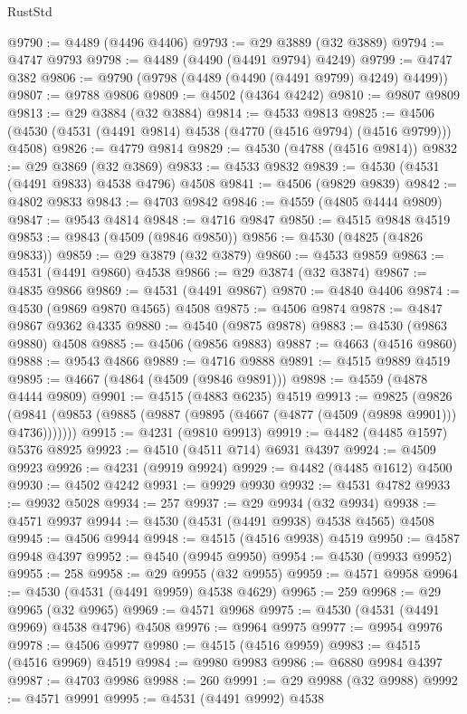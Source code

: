 \begin{lexlean}{RustStd}
\begin{coremodule}
@9790 := @4489 (@4496 @4406)
@9793 := @29 @3889 (@32 @3889)
@9794 := @4747 @9793
@9798 := @4489 (@4490 (@4491 @9794) @4249)
@9799 := @4747 @382
@9806 := @9790 (@9798 (@4489 (@4490 (@4491 @9799) @4249) @4499))
@9807 := @9788 @9806
@9809 := @4502 (@4364 @4242)
@9810 := @9807 @9809
@9813 := @29 @3884 (@32 @3884)
@9814 := @4533 @9813
@9825 := @4506 (@4530 (@4531 (@4491 @9814) @4538 (@4770 (@4516 @9794) (@4516 @9799))) @4508)
@9826 := @4779 @9814
@9829 := @4530 (@4788 (@4516 @9814))
@9832 := @29 @3869 (@32 @3869)
@9833 := @4533 @9832
@9839 := @4530 (@4531 (@4491 @9833) @4538 @4796) @4508
@9841 := @4506 (@9829 @9839)
@9842 := @4802 @9833
@9843 := @4703 @9842
@9846 := @4559 (@4805 @4444 @9809)
@9847 := @9543 @4814
@9848 := @4716 @9847
@9850 := @4515 @9848 @4519
@9853 := @9843 (@4509 (@9846 @9850))
@9856 := @4530 (@4825 (@4826 @9833))
@9859 := @29 @3879 (@32 @3879)
@9860 := @4533 @9859
@9863 := @4531 (@4491 @9860) @4538
@9866 := @29 @3874 (@32 @3874)
@9867 := @4835 @9866
@9869 := @4531 (@4491 @9867)
@9870 := @4840 @4406
@9874 := @4530 (@9869 @9870 @4565) @4508
@9875 := @4506 @9874
@9878 := @4847 @9867 @9362 @4335
@9880 := @4540 (@9875 @9878)
@9883 := @4530 (@9863 @9880) @4508
@9885 := @4506 (@9856 @9883)
@9887 := @4663 (@4516 @9860)
@9888 := @9543 @4866
@9889 := @4716 @9888
@9891 := @4515 @9889 @4519
@9895 := @4667 (@4864 (@4509 (@9846 @9891)))
@9898 := @4559 (@4878 @4444 @9809)
@9901 := @4515 (@4883 @6235) @4519
@9913 := @9825
    (@9826 (@9841 (@9853 (@9885 (@9887 (@9895 (@4667 (@4877 (@4509 (@9898 @9901))) @4736)))))))
@9915 := @4231 (@9810 @9913)
@9919 := @4482 (@4485 @1597) @5376 @8925
@9923 := @4510 (@4511 @714) @6931 @4397
@9924 := @4509 @9923
@9926 := @4231 (@9919 @9924)
@9929 := @4482 (@4485 @1612) @4500
@9930 := @4502 @4242
@9931 := @9929 @9930
@9932 := @4531 @4782
@9933 := @9932 @5028
@9934 := 257
@9937 := @29 @9934 (@32 @9934)
@9938 := @4571 @9937
@9944 := @4530 (@4531 (@4491 @9938) @4538 @4565) @4508
@9945 := @4506 @9944
@9948 := @4515 (@4516 @9938) @4519
@9950 := @4587 @9948 @4397
@9952 := @4540 (@9945 @9950)
@9954 := @4530 (@9933 @9952)
@9955 := 258
@9958 := @29 @9955 (@32 @9955)
@9959 := @4571 @9958
@9964 := @4530 (@4531 (@4491 @9959) @4538 @4629)
@9965 := 259
@9968 := @29 @9965 (@32 @9965)
@9969 := @4571 @9968
@9975 := @4530 (@4531 (@4491 @9969) @4538 @4796) @4508
@9976 := @9964 @9975
@9977 := @9954 @9976
@9978 := @4506 @9977
@9980 := @4515 (@4516 @9959)
@9983 := @4515 (@4516 @9969) @4519
@9984 := @9980 @9983
@9986 := @6880 @9984 @4397
@9987 := @4703 @9986
@9988 := 260
@9991 := @29 @9988 (@32 @9988)
@9992 := @4571 @9991
@9995 := @4531 (@4491 @9992) @4538

\end{coremodule}
\end{lexlean}
